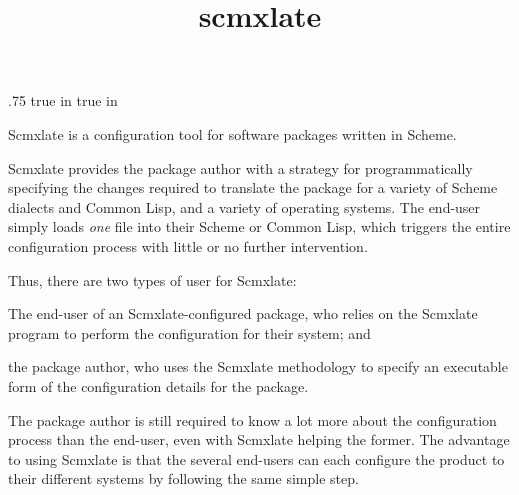 



\let\TZPtexlayout 0
\let\n\noindent
\let\f\numberedfootnote

\ifx\shipout\toHTML
\let\oldsection\section
\def\section{\eject\oldsection}
\fi
\let\re\subsection


\advance\hoffset .75 true in
\advance{} true in

\title{scmxlate}


\centerline{} %

\centerline{}

\medskip

Scmxlate is a configuration tool for software
packages written in Scheme.

Scmxlate provides the package author with a strategy
for programmatically specifying the changes required to
translate the package for a variety of Scheme dialects
and Common Lisp, and a variety of operating systems.
The end-user simply loads {\em one} file into
their Scheme or Common Lisp, which triggers the entire
configuration process with little or no further
intervention.

Thus, there are two types of user for Scmxlate:

\item{\bull} The end-user of an Scmxlate-configured package, who
relies on the
Scmxlate program to perform the configuration
for their system; and
\item{\bull} the package author, who uses the Scmxlate
methodology to specify an executable form of the
configuration details for the package.

The package author is still required to know a lot more
about the configuration process than the end-user, even
with Scmxlate helping the former.
The advantage to using Scmxlate is that the several
end-users can each configure the product to their
different systems by following the same simple
step.

